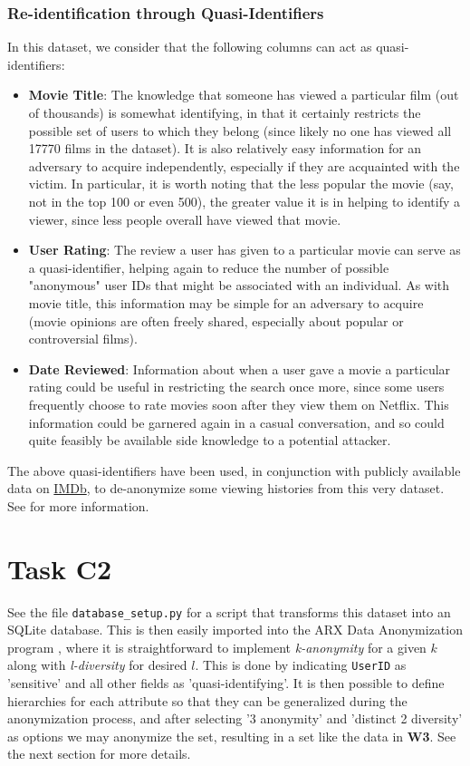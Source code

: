 \documentclass{article}
\providecommand{\task}[1]{\section{Task #1}}
\providecommand{\inlinecode}{\texttt}
\begin{document}
\subsubsection{Re-identification through Quasi-Identifiers}
In this dataset, we consider that the following columns can act as quasi-identifiers:
\begin{itemize}
  \item \textbf{Movie Title}: The knowledge that someone has viewed a particular film (out of thousands) is somewhat identifying, in that it certainly restricts the possible set of users to which they belong (since likely no one has viewed all 17770 films in the dataset).
  It is also relatively easy information for an adversary to acquire independently, especially if they are acquainted with the victim.
  In particular, it is worth noting that the less popular the movie (say, not in the top 100 or even 500), the greater value it is in helping to identify a viewer, since less people overall have viewed that movie.
  \item \textbf{User Rating}: The review a user has given to a particular movie can serve as a quasi-identifier, helping again to reduce the number of possible "anonymous" user IDs that might be associated with an individual. As with movie title, this information may be simple for an adversary to acquire (movie opinions are often freely shared, especially about popular or controversial films).
  \item \textbf{Date Reviewed}: Information about when a user gave a movie a particular rating could be useful in restricting the search once more, since some users frequently choose to rate movies soon after they view them on Netflix. This information could be garnered again in a casual conversation, and so could quite feasibly be available side knowledge to a potential attacker.
\end{itemize}
The above quasi-identifiers have been used, in conjunction with publicly available data on \href{https://www.imdb.com/}{IMDb}, to de-anonymize some viewing histories from this very dataset. See \cite{narayanan2008robust} for more information.

\task{C2}
See the file \inlinecode{database\_setup.py} for a script that transforms this dataset into an SQLite database.
This is then easily imported into the ARX Data Anonymization program \cite{prasser2014arx}, where it is straightforward to implement \textit{k-anonymity} for a given $k$ along with \textit{l-diversity} for desired $l$.
This is done by indicating \inlinecode{UserID} as 'sensitive' and all other fields as 'quasi-identifying'.
It is then possible to define hierarchies for each attribute so that they can be generalized during the anonymization process, and after selecting '3 anonymity' and 'distinct 2 diversity' as options we may anonymize the set, resulting in a set like the data in \textbf{W3}. See the next section for more details.
\end{document}
